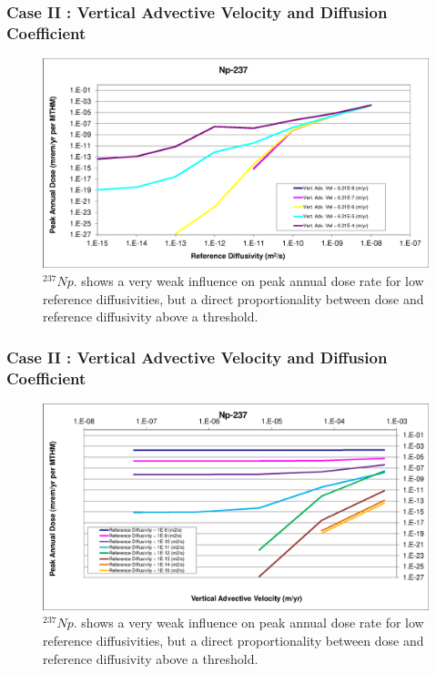 \begin{frame}[c]
  \frametitle{Case II : Vertical Advective Velocity and Diffusion Coefficient}
\begin{figure}[htp!]
\centering
\includegraphics[width=\linewidth]{AdvVelAndDiffCoeffEBSFail/Np-237.eps}
\caption{$^{237}Np$.
shows a very weak influence on peak annual dose 
rate for low reference diffusivities, but a direct proportionality between 
dose and reference diffusivity above a threshold.}
\label{fig:VAdvVelNp237}
\end{figure}
\end{frame}

\begin{frame}[c]
  \frametitle{Case II : Vertical Advective Velocity and Diffusion Coefficient}
\begin{figure}[ht!]
\centering
\includegraphics[width=\linewidth]{AdvVelAndDiffCoeffEBSFail/Np-237-VAdvVel.eps}
\caption{$^{237}Np$.
shows a very weak influence on peak annual dose 
rate for low reference diffusivities, but a direct proportionality between 
dose and reference diffusivity above a threshold.}
\label{fig:VAdvVelNp237VAdvVel}
\end{figure}
\end{frame}

